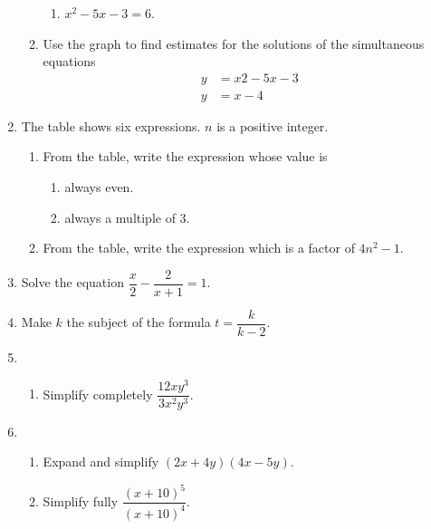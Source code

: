 \begin{enumerate}
\begin{enumerate}
\begin{enumerate}
      \item $x^2 - 5x - 3 = 6$.\strch
    \end{enumerate}
    \item Use the graph to find estimates for the solutions of the simultaneous equations
    \begin{align*}
      y &= x2 - 5x - 3\\
      y &= x - 4
    \end{align*}\strch
  \end{enumerate}
  \item The table shows six expressions. $n$ is a positive integer.\par
  \begin{table}[H]
    \centering
  \end{table}
  \begin{enumerate}
    \item From the table, write the expression whose value is
    \begin{enumerate}
      \item always even.
      \item always a multiple of 3.
    \end{enumerate}
    \item From the table, write the expression which is a factor of $4n^2 - 1$.\strch
  \end{enumerate}
  \item Solve the equation $\dfrac{x}{2} - \dfrac{2}{x + 1} = 1$.\strch
  \newpage
  \item Make $k$ the subject of the formula $t = \dfrac{k}{k - 2}$.\strch
  \item %
  \begin{enumerate}
    \item Simplify completely $\dfrac{12xy^3}{3x^2y^3}$.\strch
  \end{enumerate}
  \item %
  \begin{enumerate}
    \item Expand and simplify $(2x + 4y)(4x - 5y)$.\strch
    \item Simplify fully $\dfrac{(x + 10)^5}{(x + 10)^4}$.\strch

\end{enumerate}
\end{enumerate}
